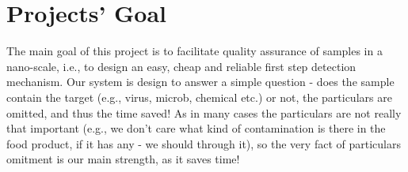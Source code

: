 \section{Projects' Goal}
The main goal of this project is to facilitate quality assurance of samples in a nano-scale, i.e., to design an easy, cheap and reliable first step detection mechanism. Our system is design to answer a simple question - does the sample contain the target (e.g., virus, microb, chemical etc.) or not, the particulars are omitted, and thus the time saved! As in many cases the particulars are not really that important (e.g., we don't care what kind of contamination is there in the food product, if it has any - we should through it), so the very fact of particulars omitment is our main strength, as it saves time!
